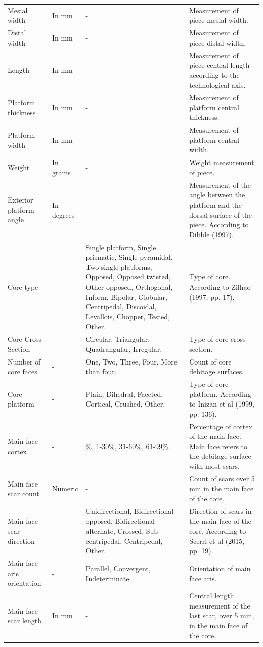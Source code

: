 \documentclass[12pt,twoside]{reedthesis}
\begin{document}
\begin{landscape}
\begin{longtable}[t]{>{\raggedright\arraybackslash}p{2cm}>{\raggedright\arraybackslash}p{3cm}>{\raggedright\arraybackslash}p{6cm}>{\raggedright\arraybackslash}p{9cm}}
Mesial width & In mm & - & Measurement of piece mesial width.\\
Distal width & In mm & - & Measurement of piece distal width.\\
Length & In mm & - & Measurement of piece central length according to the technological axis.\\
\addlinespace
Platform thickness & In mm & - & Measurement of platform central thickness.\\
Platform width & In mm & - & Measurement of platform central width.\\
Weight & In grams & - & Weight measurement of piece.\\
Exterior platform angle & In degrees & - & Measurement of the angle between the platform and the dorsal surface of the piece. According to Dibble (1997).\\
Core type & - & Single platform, Single prismatic, Single pyramidal, Two single platforms, Opposed, Opposed twisted, Other opposed, Orthogonal, Inform, Bipolar, Globular, Centripedal, Discoidal, Levallois, Chopper, Tested, Other. & Type of core. According to Zilhao (1997, pp. 17).\\
\addlinespace
Core Cross Section & - & Circular, Triangular, Quadrangular, Irregular. & Type of core cross section.\\
Number of core faces & - & One, Two, Three, Four, More than four. & Count of core debitage surfaces.\\
Core platform & - & Plain, Dihedral, Faceted, Cortical, Crushed, Other. & Type of core platform. According to Inizan et al (1999, pp. 136).\\
Main face cortex & - & 0\%, 1-30\%, 31-60\%, 61-99\%. & Percentage of cortex of the main face. Main face refers to the debitage surface with most scars.\\
Main face scar count & Numeric & - & Count of scars over 5 mm in the main face of the core.\\
\addlinespace
Main face scar direction & - & Unidirectional, Bidirectional opposed, Bidirectional alternate, Crossed, Sub-centripedal, Centripedal, Other. & Direction of scars in the main face of the core. According to Scerri et al (2015, pp. 19).\\
Main face aris orientation & - & Parallel, Convergent, Indeterminate. & Orientation of main face aris.\\
Main face scar length & In mm & - & Central length measurement of the last scar, over 5 mm, in the main face of the core.\\

\end{longtable}
\end{landscape}
\end{document}
